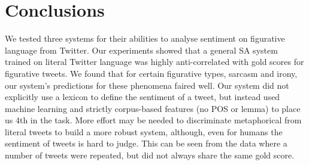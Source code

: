 \documentclass[11pt,letterpaper]{article}
\begin{document}





\section{Conclusions}
We tested three systems for their abilities to analyse sentiment on figurative language from Twitter. Our experiments showed that a general SA system trained on literal Twitter language was highly anti-correlated with gold scores for figurative tweets. We found that for certain figurative types, sarcasm and irony, our system's predictions for these phenomena faired well. Our system did not explicitly use a lexicon to define the sentiment of a tweet, but instead used machine learning and strictly corpus-based features (no POS or lemma) to place us 4th in the task. %
More effort may be needed to discriminate  metaphorical from literal tweets to build a more robust system, although, even for humans the sentiment of tweets is hard to judge. This can be seen from the data where a number of tweets were repeated, but did not always share the same gold score.






\end{document}

